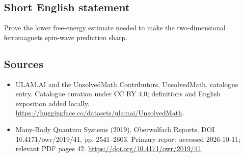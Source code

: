 \documentclass[11pt]{article}
\begin{document}
\subsection{Short English statement}
Prove the lower free-energy estimate needed to make the two-dimensional ferromagnet\textquotesingle s spin-wave prediction sharp.
\subsection{Sources}
\begin{itemize}
\item[\hypertarget{source:statement:1}{S1}] ULAM.AI and the UnsolvedMath Contributors, UnsolvedMath, catalogue entry. Catalogue curation under CC BY 4.0; definitions and English exposition added locally.
\url{https://huggingface.co/datasets/ulamai/UnsolvedMath}.
\item[\hypertarget{source:statement:2}{S2}] Many-Body Quantum Systems (2019), Oberwolfach Reports, DOI 10.4171/owr/2019/41, pp. 2541--2603. Primary report accessed 2026-10-11; relevant PDF pages 42.
\url{https://doi.org/10.4171/owr/2019/41}.
\end{itemize}
\label{end:statement}
\end{document}
